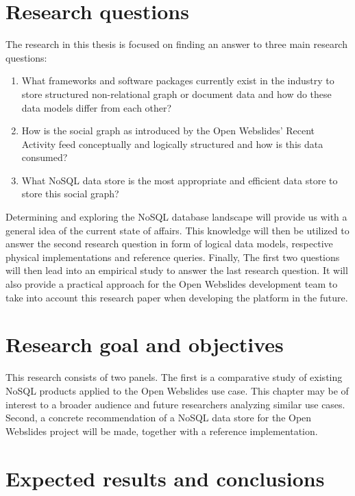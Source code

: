 \section{Research questions}
\label{sec:research-questions}

The research in this thesis is focused on finding an answer to three main research questions:

\begin{enumerate}
  \item What frameworks and software packages currently exist in the industry to store structured non-relational graph or document data and how do these data models differ from each other?
  \item How is the social graph as introduced by the Open Webslides' Recent Activity feed conceptually and logically structured and how is this data consumed?
  \item What NoSQL data store is the most appropriate and efficient data store to store this social graph?
\end{enumerate}

Determining and exploring the NoSQL database landscape will provide us with a general idea of the current state of affairs.
This knowledge will then be utilized to answer the second research question in form of logical data models, respective physical implementations and reference queries.
Finally, The first two questions will then lead into an empirical study to answer the last research question.
It will also provide a practical approach for the Open Webslides development team to take into account this research paper when developing the platform in the future.

\section{Research goal and objectives}
\label{sec:research-goal-and-objectives}

This research consists of two panels.
The first is a comparative study of existing NoSQL products applied to the Open Webslides use case.
This chapter may be of interest to a broader audience and future researchers analyzing similar use cases.
Second, a concrete recommendation of a NoSQL data store for the Open Webslides project will be made, together with a reference implementation.

\section{Expected results and conclusions}
\label{sec:expected-results-and-conclusions}

